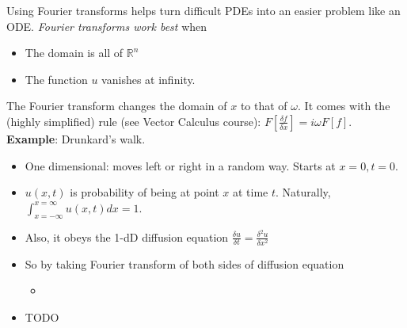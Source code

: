 \documentclass[11pt, oneside]{article}   	%
\begin{document}
Using Fourier transforms helps turn difficult PDEs into an easier problem like an ODE.  \emph{Fourier transforms work best} when 
\begin{itemize}
\item The domain is all of $\mathbb{R}^n$
\item The function $u$ vanishes at infinity.
\end{itemize}
 
The Fourier transform changes the domain of $x$ to that of $\omega$.  It comes with the (highly simplified) rule (see Vector Calculus course): $F[\frac{\delta f}{\delta x}] = i \omega F[f]$.  
\textbf{Example}: Drunkard's walk.
\begin{itemize}
\item One dimensional: moves left or right in a random way.  Starts at $x=0, t=0$.
\item $u(x,t)$ is probability of being at point $x$ at time $t$.  Naturally, $\int_{x=-\infty}^{x=\infty} u(x,t)dx = 1$.
\item Also, it obeys the 1-dD diffusion equation $\frac{\delta u}{\delta t} = \frac{\delta ^2 u}{\delta x^2}$
\item So by taking Fourier transform of both sides of diffusion equation
\begin{itemize}
\item 
\end{itemize}

\end{itemize}


\begin{itemize}
\item TODO
\end{itemize}
\end{document}
